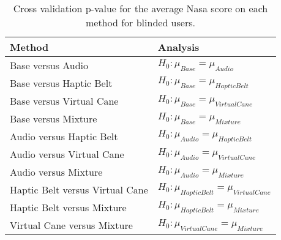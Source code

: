 
\begin{table}[!htb]
\centering
\caption{Cross validation p-value for the average Nasa score on each method for blinded users.}
\label{tab:lsd_nasa_avg}
\begin{tabular}{ll}
\toprule
                         Method &                                      Analysis \\
\midrule
              Base versus Audio &               $H_{0} : \mu_{Base} = \mu_{Audio}$ \\
        Base versus Haptic Belt &         $H_{0} : \mu_{Base} = \mu_{Haptic Belt}$ \\
       Base versus Virtual Cane &        $H_{0} : \mu_{Base} = \mu_{Virtual Cane}$ \\
            Base versus Mixture &             $H_{0} : \mu_{Base} = \mu_{Mixture}$ \\
       Audio versus Haptic Belt &        $H_{0} : \mu_{Audio} = \mu_{Haptic Belt}$ \\
      Audio versus Virtual Cane &       $H_{0} : \mu_{Audio} = \mu_{Virtual Cane}$ \\
           Audio versus Mixture &            $H_{0} : \mu_{Audio} = \mu_{Mixture}$ \\
Haptic Belt versus Virtual Cane & $H_{0} : \mu_{Haptic Belt} = \mu_{Virtual Cane}$ \\
     Haptic Belt versus Mixture &      $H_{0} : \mu_{Haptic Belt} = \mu_{Mixture}$ \\
    Virtual Cane versus Mixture &     $H_{0} : \mu_{Virtual Cane} = \mu_{Mixture}$ \\
\bottomrule
\end{tabular}
\end{table}

